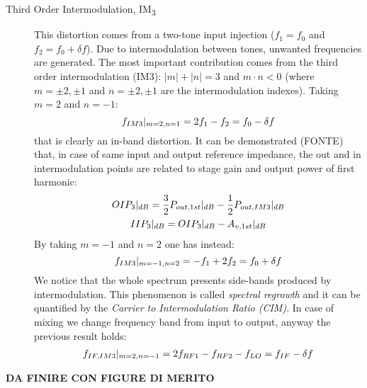 \begin{description}
	\item [Third Order Intermodulation, IM\textsubscript{3}] This distortion comes from a two-tone input injection ($f_1 = f_0$ and $f_2=f_0+\delta f$). Due to intermodulation between tones, unwanted frequencies are generated. The most important contribution comes from the third order intermodulation (IM3): $|m|+|n|=3$ and $m\cdot n<0$ (where $m=\pm2,\pm1$ and $n=\pm2,\pm1$ are the intermodulation indexes). Taking $m=2$ and $n=-1$:
	\begin{equation}
		f_{IM3}|_{m=2,n=1} =  2f_1 - f_2 = f_0 - \delta f \notag
	\end{equation}
	that is clearly an in-band distortion.
	It can be demonstrated (FONTE) that, in case of same input and output reference impedance, the out and in intermodulation points are related to stage gain and output power of first harmonic:
	\begin{gather}
	OIP_3|_{dB} = \frac{3}{2}P_{out,1st}|_{dB}-\frac{1}{2}P_{out,IM3}|_{dB} \notag \\
	IIP_3|_{dB} = OIP_3|_{dB}-A_{v,1st}|_{dB} \notag
	\end{gather} 
	By taking $m=-1$ and $n=2$ one has instead:
	\begin{equation}
	f_{IM3}|_{m=-1,n=2} =  -f_1 +2 f_2 = f_0 + \delta f \notag
	\end{equation} 
	We notice that the whole spectrum presents side-bands produced by intermodulation. This phenomenon is called \emph{spectral regrowth} and it can be quantified by the \emph{Carrier to Intermodulation Ratio (CIM)}.
	In case of mixing we change frequency band from input to output, anyway the previous result holds:
	\begin{gather}
			f_{IF,IM3}|_{m=2,n=-1} = 2f_{RF1} - f_{RF2} -f_{LO}= f_{IF} - \delta f \notag
	\end{gather}
\end{description}

\textbf{DA FINIRE CON FIGURE DI MERITO}